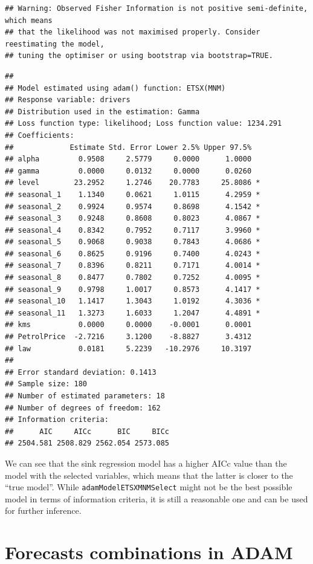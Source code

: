 \documentclass[
]{book}
\theoremstyle{definition}
\theoremstyle{definition}
\theoremstyle{definition}
\theoremstyle{definition}
\theoremstyle{remark}
\begin{document}
\begin{verbatim}
## Warning: Observed Fisher Information is not positive semi-definite, which means
## that the likelihood was not maximised properly. Consider reestimating the model,
## tuning the optimiser or using bootstrap via bootstrap=TRUE.
\end{verbatim}

\begin{verbatim}
## 
## Model estimated using adam() function: ETSX(MNM)
## Response variable: drivers
## Distribution used in the estimation: Gamma
## Loss function type: likelihood; Loss function value: 1234.291
## Coefficients:
##             Estimate Std. Error Lower 2.5% Upper 97.5%  
## alpha         0.9508     2.5779     0.0000      1.0000  
## gamma         0.0000     0.0132     0.0000      0.0260  
## level        23.2952     1.2746    20.7783     25.8086 *
## seasonal_1    1.1340     0.0621     1.0115      4.2959 *
## seasonal_2    0.9924     0.9574     0.8698      4.1542 *
## seasonal_3    0.9248     0.8608     0.8023      4.0867 *
## seasonal_4    0.8342     0.7952     0.7117      3.9960 *
## seasonal_5    0.9068     0.9038     0.7843      4.0686 *
## seasonal_6    0.8625     0.9196     0.7400      4.0243 *
## seasonal_7    0.8396     0.8211     0.7171      4.0014 *
## seasonal_8    0.8477     0.7802     0.7252      4.0095 *
## seasonal_9    0.9798     1.0017     0.8573      4.1417 *
## seasonal_10   1.1417     1.3043     1.0192      4.3036 *
## seasonal_11   1.3273     1.6033     1.2047      4.4891 *
## kms           0.0000     0.0000    -0.0001      0.0001  
## PetrolPrice  -2.7216     3.1200    -8.8827      3.4312  
## law           0.0181     5.2239   -10.2976     10.3197  
## 
## Error standard deviation: 0.1413
## Sample size: 180
## Number of estimated parameters: 18
## Number of degrees of freedom: 162
## Information criteria:
##      AIC     AICc      BIC     BICc 
## 2504.581 2508.829 2562.054 2573.085
\end{verbatim}

We can see that the sink regression model has a higher AICc value than the model with the selected variables, which means that the latter is closer to the ``true model''. While \texttt{adamModelETSXMNMSelect} might not be the best possible model in terms of information criteria, it is still a reasonable one and can be used for further inference.

\hypertarget{ADAMCombinations}{%
\section{Forecasts combinations in ADAM}\label{ADAMCombinations}}
\end{document}
